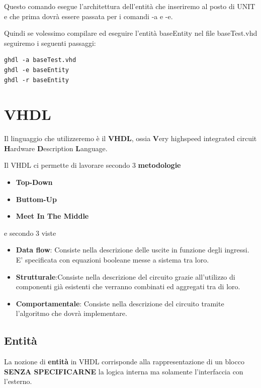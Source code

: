 \documentclass[a4paper]{book}
\begin{document}
Questo comando esegue l'architettura dell'entità che inseriremo al posto di UNIT e che prima dovrà essere passata per i comandi -a e -e.



Quindi se volessimo compilare ed eseguire l'entità baseEntity nel file baseTest.vhd seguiremo i seguenti passaggi:
\begin{verbatim}
ghdl -a baseTest.vhd
ghdl -e baseEntity
ghdl -r baseEntity
\end{verbatim}

\section{VHDL}

Il linguaggio che utilizzeremo è il \textbf{VHDL}, ossia \textbf{V}ery highspeed integrated circuit \textbf{H}ardware \textbf{D}escription \textbf{L}anguage.

Il VHDL ci permette di lavorare secondo 3 \textbf{metodologie}

\begin{itemize}
\item \textbf{Top-Down}
\item \textbf{Buttom-Up}
\item \textbf{Meet In The Middle}
\end{itemize}

e secondo 3 viste

\begin{itemize}
\item \textbf{Data flow}: \newline Consiste nella descrizione delle uscite in funzione degli ingressi. E' specificata con equazioni booleane messe a sistema tra loro.
\item \textbf{Strutturale}:\newline Consiste nella descrizione del circuito grazie all'utilizzo di componenti già esistenti che verranno combinati ed aggregati tra di loro. 
\item \textbf{Comportamentale}: \newline Consiste nella descrizione del circuito tramite l'algoritmo che dovrà implementare.
\end{itemize}


\newpage
\subsection{Entità}

La nozione di \textbf{entità} in VHDL corrisponde alla rappresentazione di un blocco \textbf{SENZA SPECIFICARNE} la logica interna ma solamente l'interfaccia con l'esterno.
\end{document}
